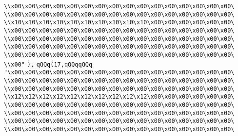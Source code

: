 \verb|\\x00\x00\x00\x00\x00\x00\x00\x00\x00\x00\x00\x00\x00\x00\x00\x00\|\newline
\verb|\\x00\x00\x00\x00\x00\x00\x00\x00\x00\x00\x00\x00\x00\x00\x00\x00\|\newline
\verb|\\x10\x10\x10\x10\x10\x10\x10\x10\x10\x10\x00\x00\x00\x00\x00\x00\|\newline
\verb|\\x00\x00\x00\x00\x00\x00\x00\x00\x00\x00\x00\x00\x00\x00\x00\x00\|\newline
\verb|\\x00\x00\x00\x00\x00\x00\x00\x00\x00\x00\x00\x00\x00\x00\x00\x00\|\newline
\verb|\\x00\x00\x00\x00\x00\x00\x00\x00\x00\x00\x00\x00\x00\x00\x00\x00\|\newline
\verb|\\x00\x00\x00\x00\x00\x00\x00\x00\x00\x00\x00\x00\x00\x00\x00\x00\|\newline
\verb|\\x00"|\newline
\verb|),|\newline
\verb|qQQq(17,qQQqqQQq|\newline
\verb|"\x00\x00\x00\x00\x00\x00\x00\x00\x00\x00\x00\x00\x00\x00\x00\x00\|\newline
\verb|\\x00\x00\x00\x00\x00\x00\x00\x00\x00\x00\x00\x00\x00\x00\x00\x00\|\newline
\verb|\\x00\x00\x00\x00\x00\x00\x00\x00\x00\x00\x00\x00\x00\x00\x00\x00\|\newline
\verb|\\x12\x12\x12\x12\x12\x12\x12\x12\x12\x12\x00\x00\x00\x00\x00\x00\|\newline
\verb|\\x00\x00\x00\x00\x00\x00\x00\x00\x00\x00\x00\x00\x00\x00\x00\x00\|\newline
\verb|\\x00\x00\x00\x00\x00\x00\x00\x00\x00\x00\x00\x00\x00\x00\x00\x00\|\newline
\verb|\\x00\x00\x00\x00\x00\x00\x00\x00\x00\x00\x00\x00\x00\x00\x00\x00\|\newline
\verb|\\x00\x00\x00\x00\x00\x00\x00\x00\x00\x00\x00\x00\x00\x00\x00\x00\|\newline
